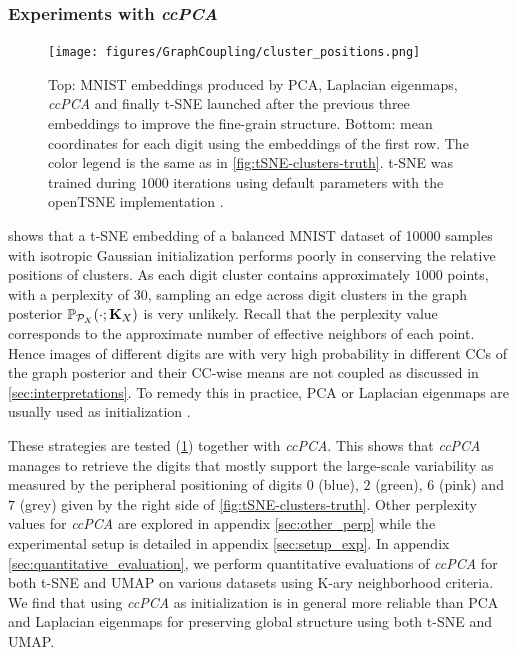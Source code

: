 \subsubsection{Experiments with \textit{ccPCA}}\label{sec:ccPCA}

\begin{figure}[t]
\begin{center}
\centerline{\texttt{[image: figures/GraphCoupling/cluster\_positions.png]}}
\caption{Top: MNIST embeddings produced by PCA, Laplacian eigenmaps, \textit{ccPCA} and finally t-SNE launched after the previous three embeddings to improve the fine-grain structure. Bottom: mean coordinates for each digit using the embeddings of the first row. The color legend is the same as in \cref{fig:tSNE-clusters-truth}. t-SNE was trained during $1000$ iterations using default parameters with the openTSNE implementation \citep{polivcar2019opentsne}.}
\label{fig:methods_embeddings}
\end{center}
\end{figure}

 shows that a t-SNE embedding of a balanced MNIST dataset of 10000 samples \citep{deng2012mnist} with isotropic Gaussian initialization performs poorly in conserving the relative positions of clusters. As each digit cluster contains approximately $1000$ points, with a perplexity of $30$, sampling an edge across digit clusters in the graph posterior $\mathbb{P}_{\mathcal{P}_X}(\cdot;\mathbf{K}_{X})$ is very unlikely. Recall that the perplexity value \citep{maaten2008tSNE} corresponds to the approximate number of effective neighbors of each point. Hence images of different digits are with very high probability in different CCs of the graph posterior and their CC-wise means are not coupled as discussed in \cref{sec:interpretations}. To remedy this in practice, PCA or Laplacian eigenmaps are usually used as initialization \citep{kobak2021initialization}. 

These strategies are tested (\cref{fig:methods_embeddings}) together with \textit{ccPCA}. This shows that 
\textit{ccPCA} manages to retrieve the digits that mostly support the large-scale variability as measured by the peripheral positioning of digits $0$ (blue), $2$ (green), $6$ (pink) and $7$ (grey) given by the right side of \cref{fig:tSNE-clusters-truth}. Other perplexity values for \textit{ccPCA} are explored in appendix \ref{sec:other_perp} while the experimental setup is detailed in appendix \ref{sec:setup_exp}. In appendix \ref{sec:quantitative_evaluation}, we perform quantitative evaluations of \textit{ccPCA} for both t-SNE and UMAP on various datasets using K-ary neighborhood criteria. We find that using \textit{ccPCA} as initialization is in general more reliable than PCA and Laplacian eigenmaps for preserving global structure using both t-SNE and UMAP. 

